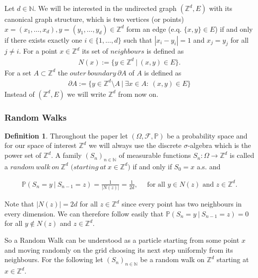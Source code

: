 \documentclass[12pt,a4paper]{scrartcl}
\numberwithin{equation}{subsection}
\newcommand{\Z}{\mathbb{Z}} %
\newcommand{\N}{\mathbb{N}} %
\newcommand{\1}{\mathbbm{1}}
\numberwithin{equation}{section}
\theoremstyle{definition}
\newtheorem{definition}{Definition}[subsection]
\begin{document}
Let $d\in \N$. We will be interested in the undirected graph $(\mathbb{Z}^d, E)$ with its canonical graph structure, which is two vertices (or points) $x=(x_1,\dots,x_d),y=(y_1,\dots,y_d)\in \mathbb{Z}^d$ form an edge (e.q. $\{x,y\}\in E$) if and only if there exists exactly one $i\in \{1,\dots, d\}$ such that $|x_i - y_i| = 1$ and $x_j = y_j$ for all $j\neq i$. For a point $x\in \mathbb{Z}^d$ its set of $\mathit{neighbours}$ is defined as 
\begin{align*}
	N(x) := \{y\in \mathbb{Z}^d\ |\ (x,y)\in E\}.
\end{align*}
For a set $A\subset \mathbb{Z}^d$ the $\mathit{outer\ boundary}\ \partial A$ of $A$ is defined as 
\begin{align*}
	\partial A := \{y\in \mathbb{Z}^d\setminus A\ |\ \exists x\in A:\ (x,y)\in E\}
\end{align*}
Instead of $(\mathbb{Z}^d, E)$ we will write $\mathbb{Z}^d$ from now on. 

\subsubsection{Random Walks}

\begin{definition}
	Throughout the paper let  $(\Omega,\mathcal{F}, \mathbb{P})$ be a probability space and for our space of interest $\mathbb{Z}^d$ we will always use the discrete $\sigma$-algebra which is the power set of $\mathbb{Z}^d$. A family $(S_n)_{n\in \mathbb{N}}$ of measurable functions $S_n: \Omega \to \mathbb{Z}^d$ is called a $\mathit{random\ walk\ on}\ \mathbb{Z}^d$ $\mathit{(starting\ at}\ x\in \mathbb{Z}^d)$ if and only if $S_0=x$ a.s. and 
	
	\begin{align*}
		\mathbb{P}(S_n = y\ |\ S_{n-1} = z) = \frac{1}{|N(z)|} = \frac{1}{2d},\quad \text{ for all }  y\in N(z) \text{ and } z\in \Z^d.
	\end{align*}
	
	\noindent Note that $|N(z)| = 2d$ for all $z\in \mathbb{Z}^d$ since every point has two neighbours in every dimension. We can therefore follow easily that $\mathbb{P}(S_n = y\ |\ S_{n-1} = z) = 0$ for all $y\notin N(z)$ and $z\in \Z^d$. 
\end{definition}
So a Random Walk can be understood as a particle starting from some point $x$ and moving randomly on the grid choosing its next step uniformly from its neighbours. For the following let $(S_n)_{n\in \mathbb{N}}$ be a random walk on $\Z^d$ starting at $x\in \Z^d$. 
\end{document}
